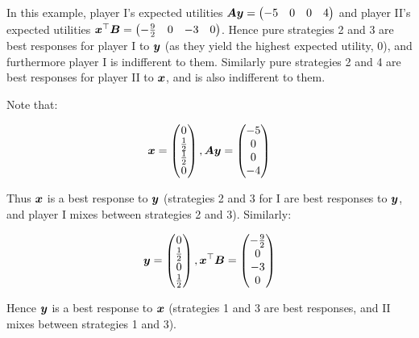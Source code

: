 In this example, player I's expected utilities $\bm{A} \bm{y} =
\begin{pmatrix} -5 & 0 & 0 & 4 \end{pmatrix}$ and player II's expected
	utilities $\bm{x}^\top \bm{B} = \begin{pmatrix} -\frac{9}{2} & 0 & -3 &
	0 \end{pmatrix}$. Hence pure strategies 2 and 3 are best responses for
	player I to $\bm{y}$ (as they yield the highest expected utility, 0), and
	furthermore player I is indifferent to them. Similarly pure strategies 2
	and 4 are best responses for player II to $\bm{x}$, and is also
	indifferent to them.

Note that:

\begin{equation*}
	\bm{x} =
	\begin{pmatrix}
		0 \\
		\frac{1}{2} \\
		\frac{1}{2} \\
		0
	\end{pmatrix},
	\bm{A} \bm{y} =
	\begin{pmatrix}
		-5 \\
		0 \\
		0 \\
		-4
	\end{pmatrix}
\end{equation*}

Thus $\bm{x}$ is a best response to $\bm{y}$ (strategies 2 and 3 for I are
best responses to $\bm{y}$, and player I mixes between strategies 2 and 3).
Similarly:

\begin{equation*}
	\bm{y} =
	\begin{pmatrix}
		0 \\
		\frac{1}{2} \\
		0 \\
		\frac{1}{2} \\
	\end{pmatrix},
	\bm{x}^\top \bm{B} = 
	\begin{pmatrix}
		-\frac{9}{2} \\
		0 \\
		-3 \\
		0 \\
	\end{pmatrix}
\end{equation*}

Hence $\bm{y}$ is a best response to $\bm{x}$ (strategies 1 and 3 are best
responses, and II mixes between strategies 1 and 3).

